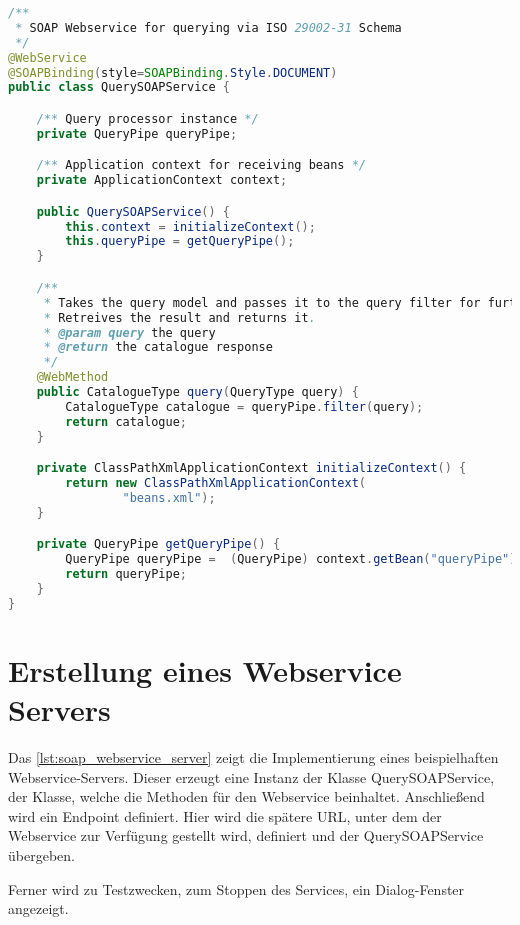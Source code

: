 \begin{lstlisting}[caption=SOAP Webservice Klasse zum Senden eines Queries, language=Java, label=lst:soap_webservice_send_query]
/**
 * SOAP Webservice for querying via ISO 29002-31 Schema
 */
@WebService
@SOAPBinding(style=SOAPBinding.Style.DOCUMENT)
public class QuerySOAPService {

    /** Query processor instance */
    private QueryPipe queryPipe;

    /** Application context for receiving beans */
    private ApplicationContext context;

    public QuerySOAPService() {
        this.context = initializeContext();
        this.queryPipe = getQueryPipe();
    }

    /**
     * Takes the query model and passes it to the query filter for further processing.
     * Retreives the result and returns it.
     * @param query the query
     * @return the catalogue response
     */
    @WebMethod
    public CatalogueType query(QueryType query) {
        CatalogueType catalogue = queryPipe.filter(query);
        return catalogue;
    }

    private ClassPathXmlApplicationContext initializeContext() {
        return new ClassPathXmlApplicationContext(
                "beans.xml");
    }

    private QueryPipe getQueryPipe() {
        QueryPipe queryPipe =  (QueryPipe) context.getBean("queryPipe");
        return queryPipe;
    }
}
 \end{lstlisting}  
 
\section{Erstellung eines Webservice Servers}

Das \autoref{lst:soap_webservice_server} zeigt die Implementierung eines beispielhaften Webservice-Servers. Dieser erzeugt eine Instanz der Klasse QuerySOAPService, der Klasse, welche die Methoden für den Webservice beinhaltet. Anschließend wird ein Endpoint definiert. Hier wird die spätere \gls{URL}, unter dem der Webservice zur Verfügung gestellt wird, definiert und der QuerySOAPService übergeben. 

Ferner wird zu Testzwecken, zum Stoppen des Services, ein Dialog-Fenster angezeigt.
 
